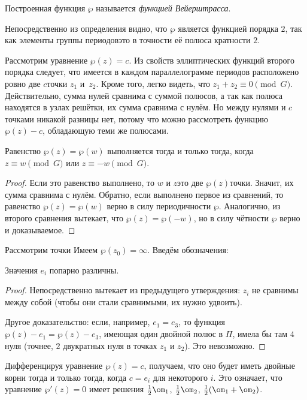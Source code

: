\documentclass[a4paper]{article}
\begin{document}
\begin{df}
Построенная функция $\wp$ называется \emph{функцией Вейерштрасса}.
\end{df}

Непосредственно из определения видно, что $\wp$ является функцией порядка $2$, так как элементы
группы периодов\т это в точности её полюса кратности $2$.

Рассмотрим уравнение $\wp(z) = c$. Из свойств эллиптических функций второго порядка
следует, что имеется в каждом параллелограмме периодов расположено ровно две $c$\д точки
$z_1$ и~$z_2$. Кроме того, легко видеть, что $z_1 + z_2 \equiv 0\pmod G$. Действительно,
сумма нулей сравнима с суммой полюсов, а так как полюса находятся в узлах решётки, их сумма
сравнима с нулём. Но между нулями и $c$\д точками никакой разницы нет, потому что можно
рассмотреть функцию $\wp(z) - c$, обладающую теми же полюсами.

\begin{stm}
Равенство $\wp(z) = \wp(w)$ выполняется тогда и только тогда, когда $z \equiv w \pmod G$
или $z \equiv -w \pmod G$.
\end{stm}
\begin{proof}
Если это равенство выполнено, то $w$ и $z$\т это две $\wp(z)$\д точки. Значит, их
сумма сравнима с нулём. Обратно, если выполнено первое из сравнений, то равенство
$\wp(z) = \wp(w)$ верно в силу периодичности $\wp$. Аналогично, из второго сравнения
вытекает, что $\wp(z) = \wp(-w)$, но в силу чётности $\wp$ верно и доказываемое.
\end{proof}

Рассмотрим точки
Имеем $\wp(z_0) = \infty$. Введём обозначения:

\begin{stm}
Значения $e_i$ попарно различны.
\end{stm}
\begin{proof}
Непосредственно вытекает из предыдущего утверждения: $z_i$ не сравнимы между
собой (чтобы они стали сравнимыми, их нужно удвоить).

Другое доказательство: если, например, $e_1 = e_3$, то функция $\wp(z) - e_1 = \wp(z) - e_3$,
имеющая один двойной полюс в $\Pi$, имела бы там $4$ нуля (точнее, $2$ двукратных нуля
в точках $z_1$ и $z_2$). Это невозможно.
\end{proof}

Дифференцируя уравнение $\wp(z) = c$, получаем, что оно будет иметь двойные корни
тогда и только тогда, когда $c=e_i$ для некоторого $i$. Это означает, что
уравнение $\wp'(z) = 0$ имеет решения $\frac12\om_1$, $\frac12\om_2$, $\frac12(\om_1+\om_2)$.
\end{document}
